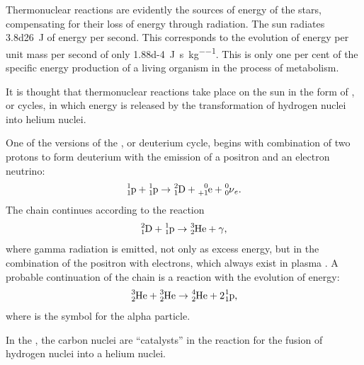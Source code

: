 Thermonuclear reactions are evidently the sources
of energy of the stars, compensating for their loss of energy through radiation. The sun radiates \SI{3.8d26}{\joule} of energy per second. This corresponds to the evolution of energy per unit mass per second of only \SI{1.88d-4}{\joule\per\second\per\kg}. This is only one per cent of the specific energy production of a living organism in the process of metabolism.

It is thought that thermonuclear reactions take place on the sun in the form of , or cycles, in which energy is released by the transformation of hydrogen nuclei into helium nuclei.

One of the versions of the , or deuterium cycle, begins with combination of two protons to form deuterium with the emission of a positron and an electron neutrino:
\begin{equation*}%
\ce{^{1}_{1}p} + \ce{^{1}_{1}p} \to \ce{^{2}_{1}D} + \ce{^{0}_{+1}e} + \ce{^{0}_{0}\nu_{e}}.
\end{equation*}
The chain continues according to the reaction
\begin{equation*}%
\ce{^{2}_{1}D} + \ce{^{1}_{1}p} \to \ce{^{3}_{2}He} + \gamma,
\end{equation*}
where gamma radiation is emitted, not only as excess energy,
but in the combination of the positron with electrons, which
always exist in plasma . A probable continuation of the chain is a reaction with the evolution of energy:
\begin{equation*}%
\ce{^{3}_{2}He} + \ce{^{3}_{2}He}  \to \ce{^{4}_{2}He} +  2\ce{^{1}_{1}p}, 
\end{equation*}
where  is the symbol for the alpha particle.

In the , the carbon nuclei are ``catalysts'' in the reaction for the fusion of hydrogen nuclei into a helium nuclei.

